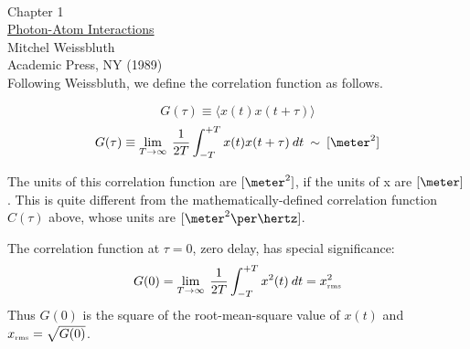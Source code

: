 \indent \\
\indent Chapter 1 \\
\indent \underline{Photon-Atom Interactions} \\
\indent Mitchel Weissbluth \\
\indent Academic Press, NY (1989) \\

Following Weissbluth, we define the correlation function as follows.

\begin{equation}
G(\tau) \equiv \langle x(t) x(t+\tau) \rangle
\end{equation}
\begin{equation}
G(\tau) \equiv \lim_{T \rightarrow \infty} \: \frac{1}{2 T} \int_{-T}^{+T} x(t) x(t+\tau) \: dt \: \sim \: [\meter^2]
\label{eq:CF}
\end{equation}

The units of this correlation function are $[\meter^2]$, if the units
of x are $[\meter]$.  This is quite different from the
mathematically-defined correlation function $C(\tau)$ above, whose
units are $[\meter^2 \per \hertz]$.

The correlation function at $\tau=0$, zero delay, has special
significance:
\begin{equation}
G(0) = \lim_{T \rightarrow \infty} \: \frac{1}{2 T} \int_{-T}^{+T} x^2(t) \: dt = x_{\mbox{\tiny rms}}^2
\end{equation}
Thus $G(0)$ is the square of the root-mean-square value of $x(t)$ and
$x_{\mbox{\tiny rms}} = \sqrt{G(0)}$.

